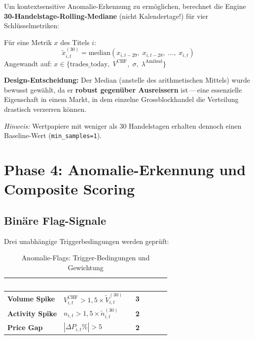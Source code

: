 \documentclass[12pt, a4paper, oneside]{report}
\newcommand{\code}[1]{\texttt{\small\textcolor{darknavy}{#1}}}
\begin{document}
Um kontextsensitive Anomalie-Erkennung zu erm\"oglichen, berechnet die Engine \textbf{30-Handelstage-Rolling-Mediane} (nicht Kalendertage!) f\"ur vier Schl\"usselmetriken:

\begin{mathbox}
F\"ur eine Metrik $x$ des Titels $i$:
\[
  \tilde{x}_{i,t}^{(30)} = \text{median}\!\left(x_{i,t-29},\; x_{i,t-28},\; \ldots,\; x_{i,t}\right)
\]
Angewandt auf: $x \in \{\text{trades\_today},\; V^{\text{CHF}},\; \sigma,\; \lambda^{\text{Amihud}}\}$

\textbf{Design-Entscheidung:} Der Median (anstelle des arithmetischen Mittels) wurde bewusst gew\"ahlt, da er \textbf{robust gegen\"uber Ausreissern} ist\,---\,eine essenzielle Eigenschaft in einem Markt, in dem einzelne Grossblockhandel die Verteilung drastisch verzerren k\"onnen.

\textit{Hinweis:} Wertpapiere mit weniger als 30 Handelstagen erhalten dennoch einen Baseline-Wert (\code{min\_samples=1}).
\end{mathbox}

\section{Phase 4: Anomalie-Erkennung und Composite Scoring}

\subsection{Bin\"are Flag-Signale}

Drei unabh\"angige Triggerbedingungen werden gepr\"uft:

\begin{table}[H]
\centering
\caption{Anomalie-Flags: Trigger-Bedingungen und Gewichtung}
\label{tab:anomaly-flags}
\begin{tabularx}{\textwidth}{>{\bfseries\sffamily}p{3cm} X >{\centering\arraybackslash}p{1.5cm}}
  \toprule
  \rowcolor{darknavy} \textcolor{white}{Flag} & \textcolor{white}{Trigger-Bedingung} & \textcolor{white}{Gewicht} \\
  \midrule
  Volume Spike    & $V_{i,t}^{\text{CHF}} > 1{,}5 \times \tilde{V}_{i,t}^{(30)}$ & \textbf{3} \\
  Activity Spike  & $n_{i,t} > 1{,}5 \times \tilde{n}_{i,t}^{(30)}$               & \textbf{2} \\
  Price Gap       & $|\Delta P_{i,t}\%| > 5$                                       & \textbf{2} \\
  \bottomrule
\end{tabularx}
\end{table}
\end{document}
